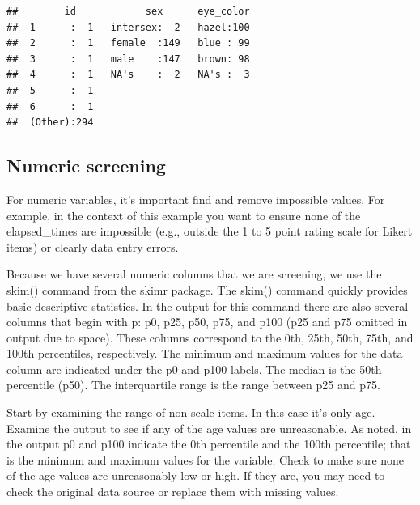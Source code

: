 \documentclass[
]{krantz}
\makeatletter
\newenvironment{Shaded}{\begin{snugshade}}{\end{snugshade}}
\newcommand{\KeywordTok}[1]{\textcolor[rgb]{0.27,0.27,0.27}{\textbf{#1}}}
\newcommand{\NormalTok}[1]{#1}
\newcommand{\OperatorTok}[1]{\textcolor[rgb]{0.43,0.43,0.43}{\textbf{#1}}}
\newcommand{\StringTok}[1]{\textcolor[rgb]{0.5,0.5,0.5}{#1}}
\newenvironment{kframe}{%
\medskip{}
\setlength{\fboxsep}{.8em}
 \def\at@end@of@kframe{}%
 \ifinner\ifhmode%
  \def\at@end@of@kframe{\end{minipage}}%
  \begin{minipage}{\columnwidth}%
 \fi\fi%
 \def\FrameCommand##1{\hskip\@totalleftmargin \hskip-\fboxsep
 \colorbox{shadecolor}{##1}\hskip-\fboxsep
     \hskip-\linewidth \hskip-\@totalleftmargin \hskip\columnwidth}%
 \MakeFramed {\advance\hsize-\width
   \@totalleftmargin\z@ \linewidth\hsize
   \@setminipage}}%
 {\par\unskip\endMakeFramed%
 \at@end@of@kframe}
\renewenvironment{Shaded}{\begin{kframe}}{\end{kframe}}
\makeatother
\begin{document}
\begin{verbatim}
##        id            sex      eye_color  
##  1      :  1   intersex:  2   hazel:100  
##  2      :  1   female  :149   blue : 99  
##  3      :  1   male    :147   brown: 98  
##  4      :  1   NA's    :  2   NA's :  3  
##  5      :  1                             
##  6      :  1                             
##  (Other):294
\end{verbatim}

\hypertarget{numeric-screening-3}{%
\subsection{Numeric screening}\label{numeric-screening-3}}

For numeric variables, it's important find and remove impossible values. For example, in the context of this example you want to ensure none of the elapsed\_times are impossible (e.g., outside the 1 to 5 point rating scale for Likert items) or clearly data entry errors.

Because we have several numeric columns that we are screening, we use the skim() command from the skimr package. The skim() command quickly provides basic descriptive statistics. In the output for this command there are also several columns that begin with p: p0, p25, p50, p75, and p100 (p25 and p75 omitted in output due to space). These columns correspond to the 0th, 25th, 50th, 75th, and 100th percentiles, respectively. The minimum and maximum values for the data column are indicated under the p0 and p100 labels. The median is the 50th percentile (p50). The interquartile range is the range between p25 and p75.

Start by examining the range of non-scale items. In this case it's only age. Examine the output to see if any of the age values are unreasonable. As noted, in the output p0 and p100 indicate the 0th percentile and the 100th percentile; that is the minimum and maximum values for the variable. Check to make sure none of the age values are unreasonably low or high. If they are, you may need to check the original data source or replace them with missing values.

\begin{Shaded}
\end{Shaded}
\end{document}
